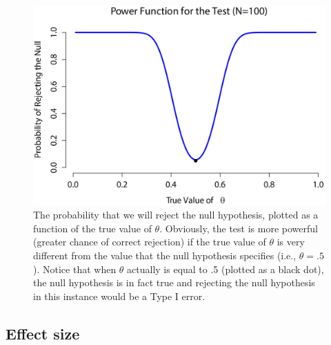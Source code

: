 \documentclass[
]{book}
\begin{document}
\begin{figure}

{\centering \includegraphics[width=1\linewidth]{img/nhst/powerTheta} 

}

\caption{The probability that we will reject the null hypothesis, plotted as a function of the true value of $\theta$. Obviously, the test is more powerful (greater chance of correct rejection) if the true value of $\theta$ is very different from the value that the null hypothesis specifies (i.e., $\theta=.5$). Notice that when $\theta$ actually is equal to .5 (plotted as a black dot), the null hypothesis is in fact true and rejecting the null hypothesis in this instance would be a Type I error.}\label{fig:powerfunction}
\end{figure}

\hypertarget{effect-size}{%
\subsection{Effect size}\label{effect-size}}
\end{document}
